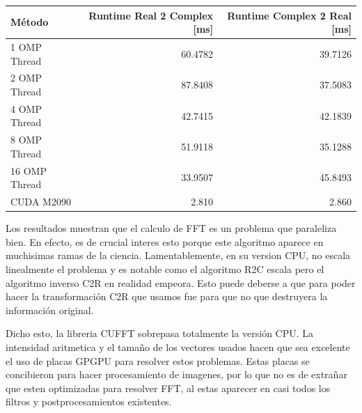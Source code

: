 \begin{table}
    \begin{tabular}{l|r|r}
        \textbf{M\'etodo} & \textbf{ Runtime Real 2 Complex [ms] } & \textbf{  Runtime Complex 2 Real [ms] } \\ \hline
         1 OMP Thread        & 60.4782 & 39.7126\\
         2 OMP Thread        & 87.8408 & 37.5083\\
         4 OMP Thread        & 42.7415 & 42.1839\\
         8 OMP Thread        & 51.9118 & 35.1288\\
         16 OMP Thread       & 33.9507 & 45.8493\\
         CUDA M2090          & 2.810     & 2.860 
        
    \end{tabular}
\end{table}

Los resultados muestran que el calculo de FFT es un problema que paraleliza bien. En efecto,
es de crucial interes esto porque este algoritmo aparece en muchisimas ramas de la ciencia. Lamentablemente, en su version CPU,
no escala linealmente el problema y es notable como el algoritmo R2C escala pero el algoritmo inverso C2R en realidad empeora.
Esto puede deberse a que para poder hacer la transformaci\'on C2R que usamos fue para que no que destruyera la informaci\'on original.

Dicho esto, la libreria CUFFT sobrepasa totalmente la versi\'on CPU. La intensidad aritmetica y el tama\~no de los vectores usados
hacen que sea excelente el uso de placas GPGPU para resolver estos problemas. Estas placas se concibieron para hacer procesamiento
de imagenes, por lo que no es de extra\~nar que esten optimizadas para resolver FFT, al estas aparecer en casi todos los
filtros y postprocesamientos existentes.
